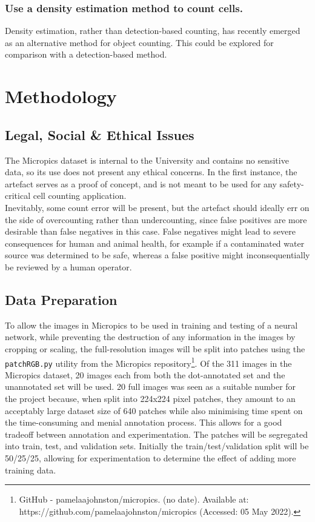 \subsubsection{Use a density estimation method to count cells.}
Density estimation, rather than detection-based counting, has recently emerged as an alternative method for object counting. This could be explored for comparison with a detection-based method.

\section{Methodology}
\subsection{Legal, Social \& Ethical Issues}
The Micropics dataset is internal to the University and contains no sensitive data, so its use does not present any ethical concerns. In the first instance, the artefact serves as a proof of concept, and is not meant to be used for any safety-critical cell counting application.\\

Inevitably, some count error will be present, but the artefact should ideally err on the side of overcounting rather than undercounting, since false positives are more desirable than false negatives in this case. False negatives might lead to severe consequences for human and animal health, for example if a contaminated water source was determined to be safe, whereas a false positive might inconsequentially be reviewed by a human operator.

\subsection{Data Preparation}
To allow the images in Micropics to be used in training and testing of a neural network, while preventing the destruction of any information in the images by cropping or scaling, the full-resolution images will be split into patches using the \verb|patchRGB.py| utility from the Micropics repository\footnote{GitHub - pamelaajohnston/micropics. (no date). Available at: https://github.com/pamelaajohnston/micropics (Accessed: 05 May 2022).}. Of the 311 images in the Micropics dataset, 20 images each from both the dot-annotated set and the unannotated set will be used. 20 full images was seen as a suitable number for the project because, when split into 224x224 pixel patches, they amount to an acceptably large dataset size of 640 patches while also minimising time spent on the time-consuming and menial annotation process. This allows for a good tradeoff between annotation and experimentation. The patches will be segregated into train, test, and validation sets. Initially the train/test/validation split will be 50/25/25, allowing for experimentation to determine the effect of adding more training data.

